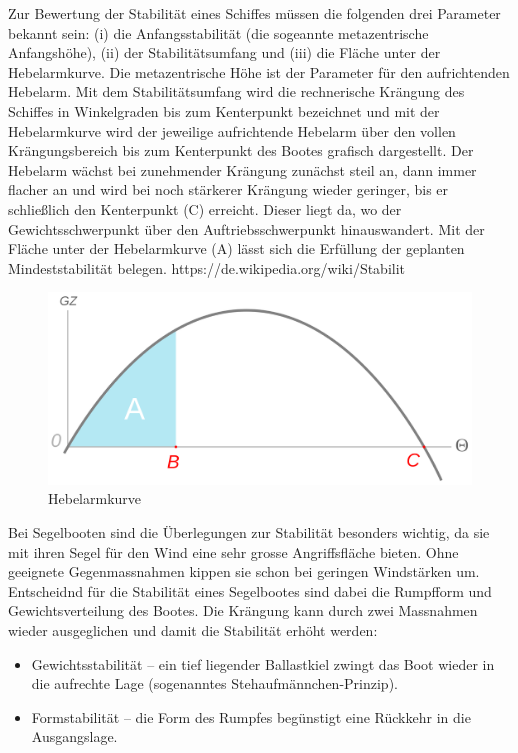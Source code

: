 Zur Bewertung der Stabilität eines Schiffes müssen die folgenden drei Parameter bekannt sein: (i) die Anfangsstabilität (die sogeannte metazentrische Anfangshöhe), (ii) der Stabilitätsumfang und (iii) die Fläche unter der Hebelarmkurve. Die metazentrische Höhe ist der Parameter für den aufrichtenden Hebelarm. Mit dem Stabilitätsumfang wird die rechnerische Krängung des Schiffes in Winkelgraden bis zum Kenterpunkt bezeichnet und mit der Hebelarmkurve wird der jeweilige aufrichtende Hebelarm über den vollen Krängungsbereich bis zum Kenterpunkt des Bootes grafisch dargestellt. Der Hebelarm wächst bei zunehmender Krängung zunächst steil an, dann immer flacher an und wird bei noch stärkerer Krängung wieder geringer, bis er schließlich den Kenterpunkt (C) erreicht. Dieser liegt da, wo der Gewichtsschwerpunkt über den Auftriebsschwerpunkt hinauswandert. Mit der Fläche unter der Hebelarmkurve (A) lässt sich die Erfüllung der geplanten Mindeststabilität belegen.  https://de.wikipedia.org/wiki/Stabilit%

\begin{figure}
    \centering
    \includegraphics[width=0.5\linewidth]{Stability_curve_NT.svg.png}
    \caption{Hebelarmkurve}
    \label{fig:enter-label}
\end{figure}
Bei Segelbooten sind die Überlegungen zur Stabilität besonders wichtig, da sie mit ihren Segel für den Wind eine sehr grosse Angriffsfläche bieten. Ohne geeignete Gegenmassnahmen kippen sie schon bei geringen Windstärken um. Entscheidnd für die Stabilität eines Segelbootes sind dabei die Rumpfform und Gewichtsverteilung des Bootes. Die Krängung kann durch zwei Massnahmen wieder ausgeglichen und damit die Stabilität erhöht werden: 
\begin{itemize}
    \item Gewichtsstabilität – ein tief liegender Ballastkiel zwingt das Boot wieder in die aufrechte Lage (sogenanntes Stehaufmännchen-Prinzip).
    \item Formstabilität – die Form des Rumpfes begünstigt eine Rückkehr in die Ausgangslage.
\end{itemize}

